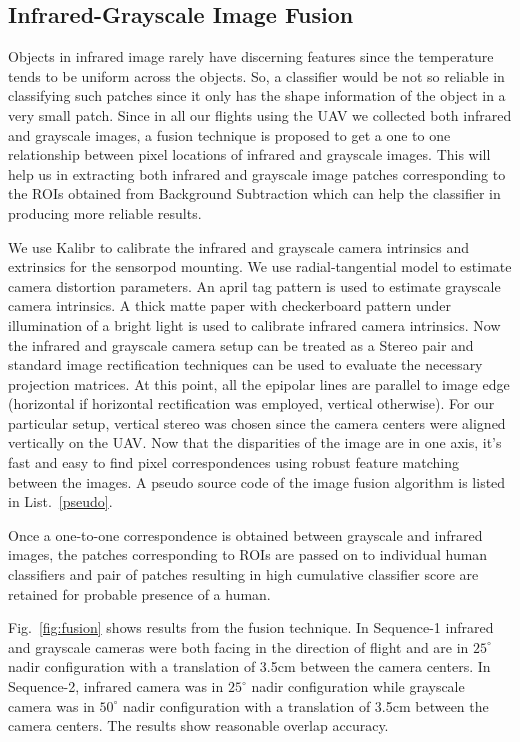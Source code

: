 \documentclass[runningheads]{llncs}
\begin{document}
\subsection{Infrared-Grayscale Image Fusion} 

Objects in infrared image rarely have discerning features since the temperature tends to be uniform across the objects. So, a classifier would be not so reliable in classifying such patches since it only has the shape information of the object in a very small patch. Since in all our flights using the UAV we collected both infrared and grayscale images, a fusion technique is proposed to get a one to one relationship between pixel locations of infrared and grayscale images. This will help us in extracting both infrared and grayscale image patches corresponding to the ROIs obtained from Background Subtraction which can help the classifier in producing more reliable results.

We use Kalibr \cite{furgale2013unified} to calibrate the infrared and grayscale camera intrinsics and extrinsics for the sensorpod mounting. We use radial-tangential model to estimate camera distortion parameters. An april tag pattern is used to estimate grayscale camera intrinsics. A thick matte paper with checkerboard pattern under illumination of a bright light is used to calibrate infrared camera intrinsics. Now the infrared and grayscale camera setup can be treated as a Stereo pair and standard image rectification techniques \cite{planar_rect} can be used to evaluate the necessary projection matrices. At this point, all the epipolar lines are parallel to image edge (horizontal if horizontal rectification was employed, vertical otherwise). For our particular setup, vertical stereo was chosen since the camera centers were aligned vertically on the UAV. Now that the disparities of the image are in one axis, it's fast and easy to find pixel correspondences using robust feature matching between the images. A pseudo source code of the image fusion algorithm is listed in List.~\ref{pseudo}.

Once a one-to-one correspondence is obtained between grayscale and infrared images, the patches corresponding to ROIs are passed on to individual human classifiers and pair of patches resulting in high cumulative classifier score are retained for probable presence of a human.


Fig.~\ref{fig:fusion} shows results from the fusion technique. In Sequence-1 infrared and grayscale cameras were both facing in the direction of flight and are in $25^{\circ}$ nadir configuration with a translation of 3.5cm between the camera centers. In Sequence-2, infrared camera was in $25^{\circ}$ nadir configuration while grayscale camera was in $50^{\circ}$ nadir configuration with a translation of 3.5cm between the camera centers. The results show reasonable overlap accuracy.
\end{document}
